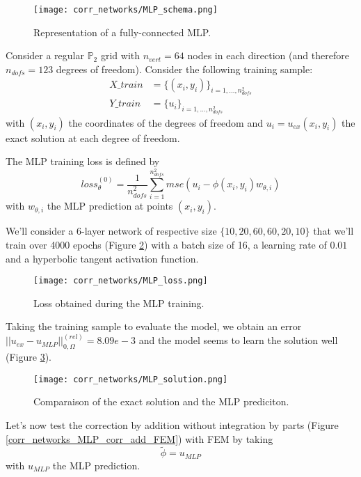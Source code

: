 \begin{figure}[H]
	\centering
	\texttt{[image: corr\_networks/MLP\_schema.png]}
	\caption{Representation of a fully-connected MLP.}
	\label{corr_networks_MLP_schema}
\end{figure} 

Consider a regular $\mathbb{P}_2$ grid with $n_{vert}=64$ nodes in each direction (and therefore $n_{dofs}=123$ degrees of freedom). Consider the following training sample:
\begin{align*}
	X\_train&=\{(x_i,y_i)\}_{i=1,\dots,n_{dofs}^2} \\
	Y\_train&=\{u_i\}_{i=1,\dots,n_{dofs}^2} 
\end{align*}
with $(x_i,y_i)$ the coordinates of the degrees of freedom and $u_i=u_{ex}(x_i,y_i)$ the exact solution at each degree of freedom.

The MLP training loss is defined by
\begin{equation*}
	loss_\theta^{(0)} = \frac{1}{n_{dofs}^2}\sum_{i=1}^{n_{dofs}^2} mse(u_i-\phi(x_i,y_i)w_{\theta,i})
\end{equation*}
with $w_{\theta,i}$ the MLP prediction at points $(x_i,y_i)$.

We'll consider a 6-layer network of respective size $\{10,20,60,60,20,10\}$ that we'll train over 4000 epochs (Figure \ref{corr_networks_MLP_loss}) with a batch size of 16, a learning rate of $0.01$ and a hyperbolic tangent activation function. 

\begin{figure}[H]
	\centering
	\texttt{[image: corr\_networks/MLP\_loss.png]}
	\caption{Loss obtained during the MLP training.}
	\label{corr_networks_MLP_loss}
\end{figure} 

Taking the training sample to evaluate the model, we obtain an error $||u_{ex}-u_{MLP}||_{0,\Omega}^{(rel)}=8.09e-3$ and the model seems to learn the solution well (Figure \ref{corr_networks_MLP_solution}).

\begin{figure}[H]
	\centering
	\texttt{[image: corr\_networks/MLP\_solution.png]}
	\caption{Comparaison of the exact solution and the MLP prediciton.}
	\label{corr_networks_MLP_solution}
\end{figure} 

Let's now test the correction by addition without integration by parts (Figure \ref{corr_networks_MLP_corr_add_FEM}) with FEM by taking
\begin{equation*}
	\tilde{\phi}=u_{MLP}
\end{equation*}
with $u_{MLP}$ the MLP prediction.

